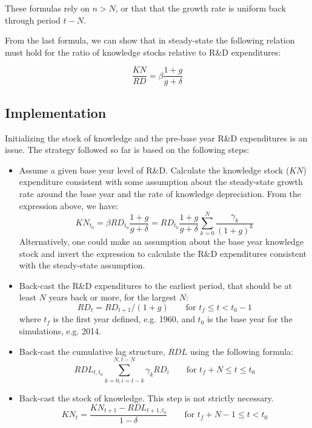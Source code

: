 These formulas rely on $n > N$, or that that the growth rate is uniform back through period $t-N$.

From the last formula, we can show that in steady-state the following
relation must hold for the ratio of knowledge stocks relative to R\&D expenditures:

\[
\frac{\mathit{KN}} {\mathit{RD}} = \beta \frac{1+g}{g+\delta}
\]

\subsection*{Implementation}

Initializing the stock of knowledge and the pre-base year R\&D expenditures
is an issue. The strategy followed so far is based on the following steps:

\begin{itemize}
	\item {Assume a given base year level of R\&D. Calculate
		the knowledge stock ($\mathit{KN}$) expenditure consistent with some assumption about the steady-state
		growth rate around the base year and the rate of knowledge depreciation.
		From the expression above, we have:
		\[{\mathit{KN}_{t_0}} = {\beta}  {\mathit{RD}_{t_0}}\frac{1+g}{g+\delta} =
		{\mathit{RD}_{t_0}} \frac{1+g}{g+\delta}\displaystyle \sum_{k=0}^N{ \frac{\gamma_{k}}{\left(1+g\right)^k} }
		\] Alternatively, one could make an assumption about the base
		year knowledge stock and invert the expression to calculate the
		R\&D expenditures consistent with the steady-state assumption.}
	\item {Back-cast the R\&D expenditures to the earliest period, that
		should be at least $N$ years back or more, for the largest $N$:
		\[
		\mathit{RD}_t = \mathit{RD}_{t+1} / \left(1+g\right) \qquad
		\textrm{for } t_f \le t < t_0-1
		\]
		where $t_f$ is the first year defined, e.g. 1960, and
		$t_0$ is the base year for the simulations, e.g. 2014.}
	\item {Back-cast the cumulative lag structure, $\mathit{RDL}$ using the following formula:
		\[
		\mathit{RDL}_{t,t_0}
		\sum_{k=0, i=t-k}^{N,t-N}{\gamma_{k}\mathit{RD}_i}
		\qquad \textrm{for } t_f+N \le t \le t_0
		\]}
	\item {Back-cast the stock of knowledge. This step is
		not strictly necessary.
		\[
		\mathit{KN}_t = \frac{\mathit{KN}_{t+1} - \mathit{RDL}_{t+1,t_0}}
		{1-\delta} \qquad \textrm{for } t_f+N-1 \le t < t_0
		\]}
	
\end{itemize}


